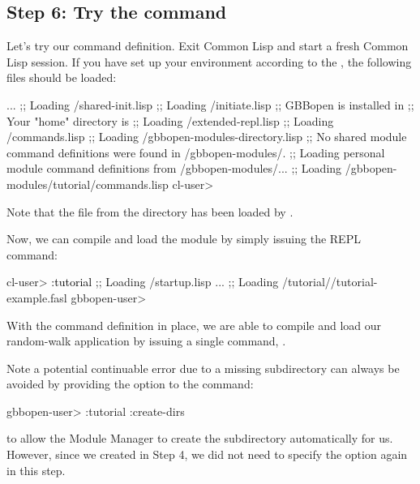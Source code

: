 \documentclass[10pt,twoside,english,pdftex]{article}
\begin{document}
\subsection*{Step 6: Try the  command}

Let's try our command definition.  Exit Common Lisp and start a fresh
Common Lisp session.  If you have set up your environment according to the
,
the following files should be loaded:
%
\W\supp
\begin{smallexample}
\textcolor{darkergray}{%
     ...
  ;; Loading /shared-init.lisp
  ;;   Loading /initiate.lisp
  ;; GBBopen is installed in 
  ;; Your "home" directory is 
  ;;     Loading /extended-repl.lisp
  ;;     Loading /commands.lisp
  ;;     Loading /gbbopen-modules-directory.lisp
  ;; No shared module command definitions were found in /gbbopen-modules/.
  ;; Loading personal module command definitions from /gbbopen-modules/...
  ;;     Loading /gbbopen-modules/tutorial/commands.lisp
  cl-user>}
\end{smallexample}
%
Note that the  file from the 
directory has been loaded by
.

Now, we can compile and load the  module by simply issuing the
 REPL command:
%
\W\supp
\begin{smallexample}
\textcolor{darkergray}{%
  cl-user> \textcolor{black}{:tutorial}
  ;; Loading /startup.lisp
     ...
  ;; Loading /tutorial//tutorial-example.fasl
  gbbopen-user>}
\end{smallexample}
%
With the command definition in place, we are able to compile and load our
random-walk application by issuing a single command, .

Note a potential continuable error due to a missing
 subdirectory can always be avoided by
providing the  option to the  command:
%
\W\supp
\begin{example}
\textcolor{darkergray}{%
  gbbopen-user> :tutorial :create-dirs}
\end{example}
%
to allow the Module Manager to create the 
subdirectory automatically for us.  However, since we created
 in Step 4, we did not need to specify the
 option again in this step.
\end{document}
